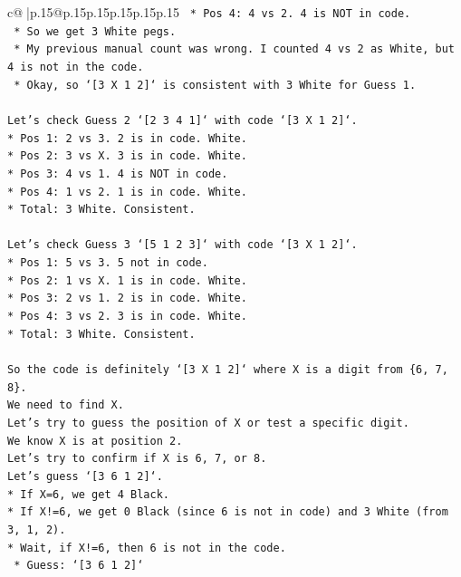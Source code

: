 \documentclass{article}
\begin{document}
{\begin{supertabular}{c@{$\;$}|p{.15\linewidth}@{}p{.15\linewidth}p{.15\linewidth}p{.15\linewidth}p{.15\linewidth}p{.15\linewidth}}
{{{\texttt{    *   Pos 4: 4 vs 2. 4 is NOT in code.} \\
\texttt{    *   So we get 3 White pegs.} \\
\texttt{    *   My previous manual count was wrong. I counted 4 vs 2 as White, but 4 is not in the code.} \\
\texttt{    *   Okay, so `{[}3 X 1 2{]}` is consistent with 3 White for Guess 1.} \\
\\ 
\texttt{Let's check Guess 2 `{[}2 3 4 1{]}` with code `{[}3 X 1 2{]}`.} \\
\texttt{*   Pos 1: 2 vs 3. 2 is in code. White.} \\
\texttt{*   Pos 2: 3 vs X. 3 is in code. White.} \\
\texttt{*   Pos 3: 4 vs 1. 4 is NOT in code.} \\
\texttt{*   Pos 4: 1 vs 2. 1 is in code. White.} \\
\texttt{*   Total: 3 White. Consistent.} \\
\\ 
\texttt{Let's check Guess 3 `{[}5 1 2 3{]}` with code `{[}3 X 1 2{]}`.} \\
\texttt{*   Pos 1: 5 vs 3. 5 not in code.} \\
\texttt{*   Pos 2: 1 vs X. 1 is in code. White.} \\
\texttt{*   Pos 3: 2 vs 1. 2 is in code. White.} \\
\texttt{*   Pos 4: 3 vs 2. 3 is in code. White.} \\
\texttt{*   Total: 3 White. Consistent.} \\
\\ 
\texttt{So the code is definitely `{[}3 X 1 2{]}` where X is a digit from \{6, 7, 8\}.} \\
\texttt{We need to find X.} \\
\texttt{Let's try to guess the position of X or test a specific digit.} \\
\texttt{We know X is at position 2.} \\
\texttt{Let's try to confirm if X is 6, 7, or 8.} \\
\texttt{Let's guess `{[}3 6 1 2{]}`.} \\
\texttt{*   If X=6, we get 4 Black.} \\
\texttt{*   If X!=6, we get 0 Black (since 6 is not in code) and 3 White (from 3, 1, 2).} \\
\texttt{*   Wait, if X!=6, then 6 is not in the code.} \\
\texttt{    *   Guess: `{[}3 6 1 2{]}`} \\
}}}
\end{supertabular}}
\end{document}
